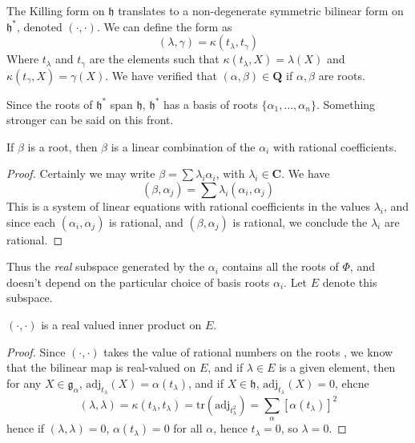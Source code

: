 The Killing form on $\mathfrak{h}$ translates to a non-degenerate symmetric bilinear form on $\mathfrak{h}^*$, denoted $(\cdot, \cdot)$. We can define the form as
%
\[ (\lambda,\gamma) = \kappa(t_\lambda, t_\gamma) \]
%
Where $t_\lambda$ and $t_\gamma$ are the elements such that $\kappa(t_\lambda,X) = \lambda(X)$ and $\kappa(t_\gamma,X) = \gamma(X)$. We have verified that $(\alpha, \beta) \in \mathbf{Q}$ if $\alpha, \beta$ are roots.

Since the roots of $\mathfrak{h}^*$ span $\mathfrak{h}$, $\mathfrak{h}^*$ has a basis of roots $\{ \alpha_1, \dots, \alpha_n \}$. Something stronger can be said on this front.

\begin{lemma}
    If $\beta$ is a root, then $\beta$ is a linear combination of the $\alpha_i$ with rational coefficients.
\end{lemma}
\begin{proof}
    Certainly we may write $\beta = \sum \lambda_i \alpha_i$, with $\lambda_i \in \mathbf{C}$. We have
    \[ (\beta, \alpha_j) = \sum \lambda_i (\alpha_i, \alpha_j) \]
    This is a system of linear equations with rational coefficients in the values $\lambda_i$, and since each $(\alpha_i, \alpha_j)$ is rational, and $(\beta, \alpha_j)$ is rational, we conclude the $\lambda_i$ are rational.
\end{proof}

Thus the {\it real} subspace generated by the $\alpha_i$ contains all the roots of $\Phi$, and doesn't depend on the particular choice of basis roots $\alpha_i$. Let $E$ denote this subspace.

\begin{theorem}
    $(\cdot, \cdot)$ is a real valued inner product on $E$.
\end{theorem}
\begin{proof}
    Since $(\cdot, \cdot)$ takes the value of rational numbers on the roots , we know that the bilinear map is real-valued on $E$, and if $\lambda \in E$ is a given element, then for any $X \in \mathfrak{g}_\alpha$, $\text{adj}_{t_\lambda}(X) = \alpha(t_\lambda)$, and if $X \in \mathfrak{h}$, $\text{adj}_{t_\lambda}(X) = 0$, ehcne
    \[ (\lambda, \lambda) = \kappa(t_\lambda, t_\lambda) = \text{tr}(\text{adj}_{t_\lambda^2}) = \sum_\alpha \left[\alpha(t_\lambda)\right]^2 \]
    hence if $(\lambda, \lambda) = 0$, $\alpha(t_\lambda) = 0$ for all $\alpha$, hence $t_\lambda = 0$, so $\lambda = 0$.
\end{proof}






